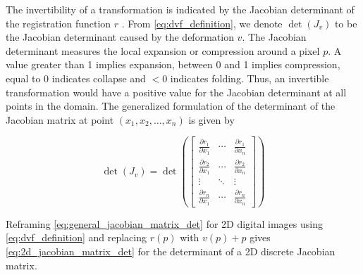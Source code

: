 \documentclass[lettersize,journal]{IEEEtran}
\begin{document}
The invertibility of a transformation is indicated by the Jacobian determinant of the registration function $r$ \cite{Yushkevich2023}. From \autoref{eq:dvf_definition}, we denote $\det(J_{v})$ to be the Jacobian determinant caused by the deformation $v$.  The Jacobian determinant measures the local expansion or compression around a pixel $p$. A value greater than 1 implies expansion, between 0 and 1 implies compression, equal to 0 indicates collapse and $<0$ indicates folding. Thus, an invertible transformation would have a positive value for the Jacobian determinant at all points in the domain. The generalized formulation of the determinant of the Jacobian matrix at point $(x_1, x_2, \ldots , x_n)$ is given by 

\begin{equation} \label{eq:general_jacobian_matrix_det}
    \det(J_{v}) = 
    \det\left( 
        \begin{bmatrix}
            \frac{\partial r_1}{\partial x_1} & \cdots & \frac{\partial r_1}{\partial x_n} \\
            \frac{\partial r_2}{\partial x_1} & \cdots & \frac{\partial r_2}{\partial x_n} \\
            \vdots & \ddots & \vdots \\
            \frac{\partial r_n}{\partial x_1} & \cdots & \frac{\partial r_n}{\partial x_n}
        \end{bmatrix}
    \right)
\end{equation}


Reframing \autoref{eq:general_jacobian_matrix_det} for 2D digital images using \autoref{eq:dvf_definition} and replacing $r(p)$ with $v(p)+p$ gives \autoref{eq:2d_jacobian_matrix_det} for the determinant of a 2D discrete Jacobian matrix.

\end{document}
